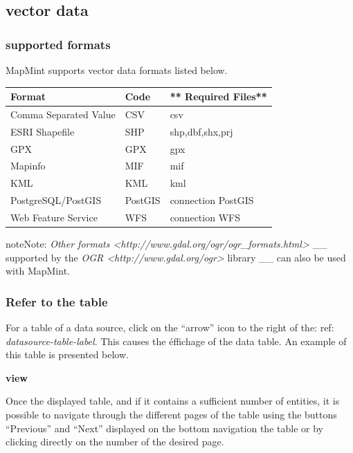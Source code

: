 \documentclass[letterpaper,10pt,english]{sphinxmanual}
\begin{document}
\subsection{vector data}
\label{data/datasources:donnees-vectorielles}

\subsubsection{supported formats}
\label{data/datasources:formats-supportes}
MapMint supports vector data formats listed below.

\begin{tabulary}{\linewidth}{|L|L|L|}
\hline

\textbf{Format}
 & 
\textbf{Code}
 & 
** Required  Files**
\\
\hline
Comma Separated Value
 & 
CSV
 & 
csv
\\
\hline
ESRI Shapefile
 & 
SHP
 & 
shp,dbf,shx,prj
\\
\hline
GPX
 & 
GPX
 & 
gpx
\\
\hline
Mapinfo
 & 
MIF
 & 
mif
\\
\hline
KML
 & 
KML
 & 
kml
\\
\hline
PostgreSQL/PostGIS
 & 
PostGIS
 & 
connection PostGIS
\\
\hline
Web Feature Service
 & 
WFS
 & 
connection WFS
\\
\hline\end{tabulary}


\begin{notice}{note}{Note:}
\emph{Other formats \textless{}http://www.gdal.org/ogr/ogr\_formats.html\textgreater{}} \_\_ supported by the  \emph{OGR \textless{}http://www.gdal.org/ogr\textgreater{}} library \_\_ can also be used with MapMint.
\end{notice}


\subsubsection{Refer to the table}
\label{data/datasources:consulter-la-table}
For a table of a data source, click on the ``arrow'' icon to the right of the: ref: \emph{datasource-table-label}. This causes the éffichage of the data table. An example of this table is presented below.

{\color{red}\bfseries{}\textbar{}view\textbar{}}

Once the displayed table, and if it contains a sufficient number of entities, it is possible to navigate through the different pages of the table using the buttons ``Previous'' and ``Next'' displayed on the bottom navigation the table or by clicking directly on the number of the desired page.
\end{document}
